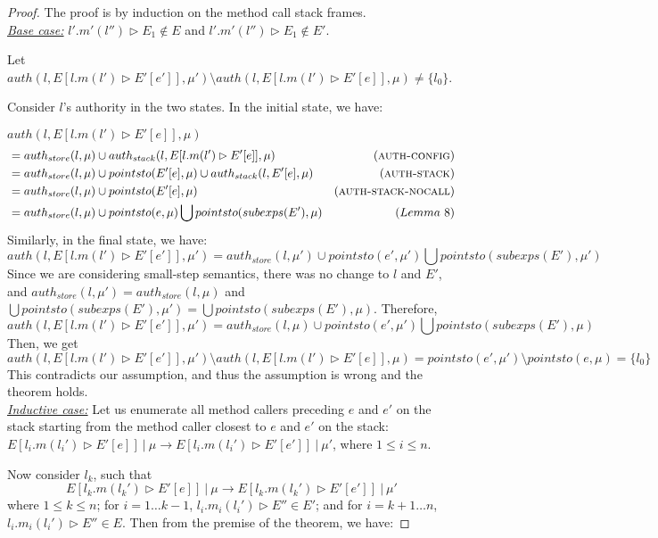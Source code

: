 \documentclass{llncs}
\begin{document}
\begin{proof}
The proof is by induction on the method call stack frames.\\

\noindent\textit{\underline{Base case:}} $l'.m'(l'') \rhd E_1 \not\in E$ and $l'.m'(l'') \rhd E_1 \not\in E'$. 

Let $auth(l, E[l.m(l') \rhd E'[e']], \mu') \setminus auth(l, E[l.m(l') \rhd E'[e]], \mu) \not= \{ l_0 \}$.

Consider $l$'s authority in the two states. In the initial state, we have:

\noindent$auth(l, E[l.m(l') \rhd E'[e]], \mu)$
\vspace{-7pt}
\begin{align*}
&= auth_{store}(l, \mu) \cup auth_{stack}(l, E[l.m(l') \rhd E'[e]], \mu) & (\textsc{auth-config})\\
&= auth_{store}(l, \mu) \cup pointsto(E'[e], \mu) \cup auth_{stack}(l, E'[e], \mu) & (\textsc{auth-stack})\\
&= auth_{store}(l, \mu) \cup pointsto(E'[e], \mu) & (\textsc{auth-stack-nocall})\\
&= auth_{store}(l, \mu) \cup pointsto(e, \mu) \bigcup pointsto(subexps(E'), \mu) & (Lemma~8)
\end{align*}
Similarly, in the final state, we have:
\[
auth(l, E[l.m(l') \rhd E'[e']], \mu') = auth_{store}(l, \mu') \cup pointsto(e', \mu') \bigcup pointsto(subexps(E'), \mu')
\]
Since we are considering small-step semantics, there was no change to $l$ and $E'$, and $auth_{store}(l, \mu') = auth_{store}(l, \mu)$ and $\bigcup pointsto(subexps(E'), \mu') = \bigcup pointsto(subexps(E'), \mu)$. Therefore,
\[
auth(l, E[l.m(l') \rhd E'[e']], \mu') = auth_{store}(l, \mu) \cup pointsto(e', \mu') \bigcup pointsto(subexps(E'), \mu)
\]
Then, we get
\[
auth(l, E[l.m(l') \rhd E'[e']], \mu') \setminus auth(l, E[l.m(l') \rhd E'[e]], \mu) = pointsto(e', \mu') \setminus pointsto(e, \mu) = \{ l_0 \}
\]
This contradicts our assumption, and thus the assumption is wrong and the theorem holds.\\

\noindent\textit{\underline{Inductive case:}} Let us enumerate all method callers preceding $e$ and $e'$ on the stack starting from the method caller closest to $e$ and $e'$ on the stack:
$E[l_i.m(l_i') \rhd E'[e]]~|~\mu \longrightarrow E[l_i.m(l_i') \rhd E'[e']]~|~\mu'$,
where $1 \leq i \leq n$.

Now consider $l_k$, such that
\[
E[l_k.m(l_k') \rhd E'[e]]~|~\mu \longrightarrow E[l_k.m(l_k') \rhd E'[e']]~|~\mu'
\]
where $1 \leq k \leq n$; for $i = 1 \dots k - 1$, $l_i.m_i(l_i') \rhd E'' \in E'$; and for $i = k + 1 \dots n$, $l_i.m_i(l_i') \rhd E'' \in E$. Then from the premise of the theorem, we have:


\end{proof}
\end{document}

